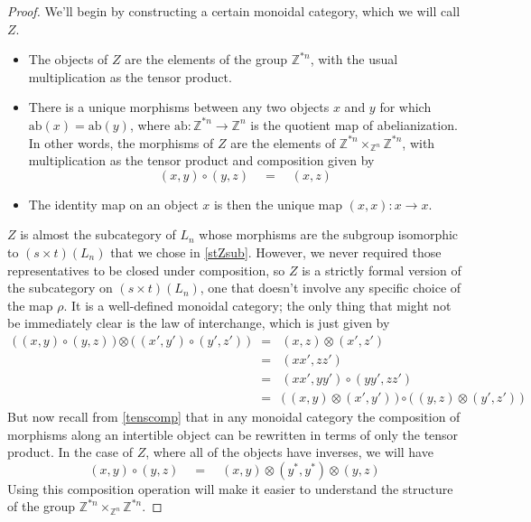 \documentclass{amsbook} %
\numberwithin{section}{chapter}
\begin{document}
\begin{proof}
We'll begin by constructing a certain monoidal category, which we will call $Z$. 
\begin{itemize}
\item The objects of $Z$ are the elements of the group $\mathbb{Z}^{\ast n}$, with the usual multiplication as the tensor product.
\item There is a unique morphisms between any two objects $x$ and $y$ for which $\mathrm{ab}(x) = \mathrm{ab}(y)$, where $\mathrm{ab} \colon  \mathbb{Z}^{\ast n} \to \mathbb{Z}^n$ is the quotient map of abelianization. In other words, the morphisms of $Z$ are the elements of $\mathbb{Z}^{\ast n} \times_{\mathbb{Z}^n} \mathbb{Z}^{\ast n}$, with multiplication as the tensor product and composition given by
\[ (x,y) \circ (y,z) \quad = \quad (x, z) \]
\item The identity map on an object $x$ is then the unique map $(x,x) \colon x \to x$.
\end{itemize}
$Z$ is almost the subcategory of $L_n$ whose morphisms are the subgroup isomorphic to $(s \times t)(L_n)$ that we chose in \cref{stZsub}. However, we never required those representatives to be closed under composition, so $Z$ is a strictly formal version of the subcategory on $(s \times t)(L_n)$, one that doesn't involve any specific choice of the map $\rho$. It is a well-defined monoidal category; the only thing that might not be immediately clear is the law of interchange, which is just given by
\[ \begin{array}{rll}
			\big( \, (x,y) \circ (y,z) \, \big) \otimes \big( \, (x',y') \circ (y',z') \, \big) & = & (x,z) \otimes (x',z') \\
			& = & (xx',zz') \\
			& = & (xx',yy') \circ (yy',zz') \\
			& = & \big( \, (x,y) \otimes (x',y') \, \big) \circ \big( \, (y,z) \otimes (y',z') \, \big) 
		\end{array}
\]
But now recall from \cref{tenscomp} that in any monoidal category the composition of morphisms along an intertible object can be rewritten in terms of only the tensor product. In the case of $Z$, where all of the objects have inverses, we will have
\[ (x,y) \circ (y, z) \quad = \quad (x, y) \otimes (y^*, y^*) \otimes (y, z) \]
Using this composition operation will make it easier to understand the structure of the group $\mathbb{Z}^{\ast n} \times_{\mathbb{Z}^n} \mathbb{Z}^{\ast n}$.


\end{proof}
\end{document}
